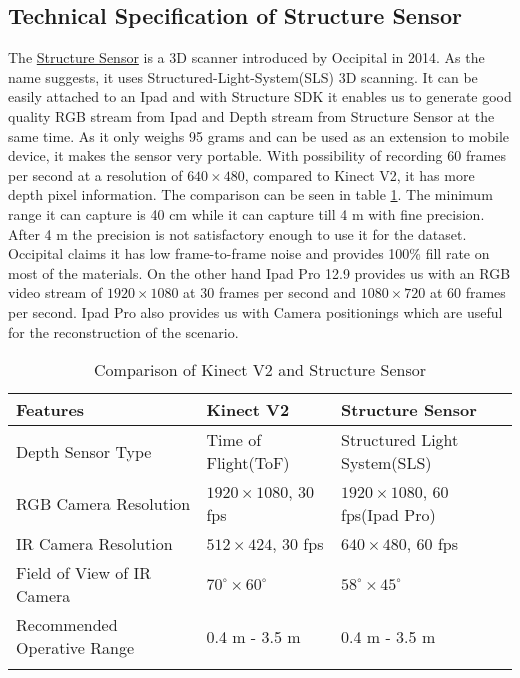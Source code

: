 \subsection{Technical Specification of Structure Sensor}
The \href{https://structure.io/}{Structure Sensor} is a 3D scanner introduced by Occipital in 2014. As the name suggests, it uses Structured-Light-System(SLS) 3D scanning. It can be easily attached to an Ipad and with Structure SDK it enables us to generate good quality RGB stream from Ipad and Depth stream from Structure Sensor at the same time. As it only weighs 95 grams and can be used as an extension to mobile device, it makes the sensor very portable. With possibility of recording 60 frames per second at a resolution of   $640\times480$, compared to Kinect V2, it has more depth pixel information. The comparison can be seen in table \ref{table:KinectVsStructureSensor}. The minimum range it can capture is 40 cm while it can capture till 4 m with fine precision. After 4 m the precision is not satisfactory enough to use it for the dataset. Occipital claims it has low frame-to-frame noise and provides 100\% fill rate on most of the materials. On the other hand Ipad Pro 12.9 provides us with an RGB video stream of $1920\times1080$ at 30 frames per second and $1080\times720$ at 60 frames per second. Ipad Pro also provides us with Camera positionings which are useful for the reconstruction of the scenario.\\

\begin{table}[h]
\begin{tabular}{@{}lll@{}}
\toprule
\textbf{Features}                    & \textbf{Kinect V2}           & \textbf{Structure Sensor}         \\ \midrule
Depth Sensor Type           & Time of Flight(ToF) & Structured Light System(SLS)                 \\
RGB Camera Resolution       & $1920\times1080$, 30 fps & $1920\times1080$, 60 fps(Ipad Pro)     \\
IR Camera Resolution        & $512\times424$, 30 fps   & $640\times480$, 60 fps                 \\ 
Field of View of IR Camera  & $70^\circ\times60^\circ$           & $58^\circ\times45^\circ$                         \\
Recommended Operative Range & 0.4 m - 3.5 m       & 0.4 m - 3.5 m                                  \\
                            &                     &                                               
\end{tabular}
\caption{Comparison of Kinect V2 and Structure Sensor}
\label{table:KinectVsStructureSensor}
\end{table}

